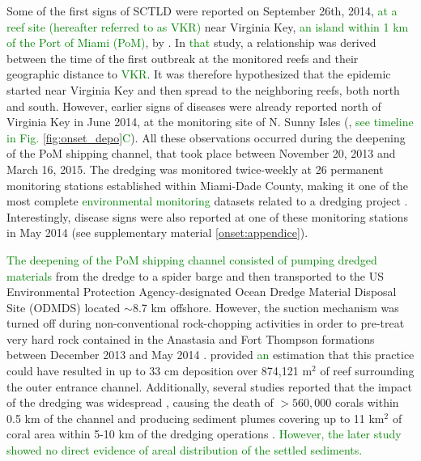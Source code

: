 \documentclass[preprint,12pt,authoryear]{elsarticle}
\newcommand{\modif}[1]{\textcolor{green}{#1}}
\begin{document}
Some of the first signs of SCTLD were reported on September 26th, 2014, \modif{at a reef site (hereafter referred to as VKR)} near Virginia Key, \modif{an island within 1 km of the Port of Miami (PoM)}, by \cite{precht2016unprecedented}. In \modif{that} study, a relationship was derived between the time of the first outbreak at the monitored reefs and their geographic distance to \modif{VKR}. It was therefore hypothesized that the epidemic started near Virginia Key and then spread to the neighboring reefs, both north and south. However, earlier signs of diseases were already reported north of Virginia Key in June 2014, at the monitoring site of N. Sunny Isles (\citealp{precht2016unprecedented}, \modif{see timeline in Fig. \ref{fig:onset_depo}C}). All these observations occurred during the deepening of the PoM shipping channel, that took place between November 20, 2013 and March 16, 2015. The dredging was monitored twice-weekly at 26 permanent monitoring stations established within Miami-Dade County, making it one of the most complete \modif{environmental monitoring} datasets related to a dredging project \citep{gintert2019regional}. Interestingly, disease signs were also reported at one of these monitoring stations in May 2014 (see supplementary material \ref{onset:appendice}).

\modif{The deepening of the PoM shipping channel consisted of pumping dredged materials} from the dredge to a spider barge and then transported to the US Environmental Protection Agency\modif{-}designated Ocean Dredge Material Disposal Site (ODMDS) located $\sim$8.7 km offshore. However, the suction mechanism was turned off during non-conventional rock-chopping activities in order to pre-treat very hard rock contained in the Anastasia and Fort Thompson formations between December 2013 and May 2014 \citep{miller2016detecting}. \cite{usace2017} provided \modif{an} estimation that this practice could have resulted in up to 33 cm deposition over 874,121 m$^2$ of reef surrounding the outer entrance channel. Additionally, several studies reported that the impact of the dredging was widespread \citep{miller2016detecting}, causing the death of  $> 560,000$ corals within 0.5 km of the channel \citep{cunning2019extensive} and producing sediment plumes covering up to 11 km$^2$ of coral area within 5-10 km of the dredging operations \citep{barnes2015sediment}. \modif{However, the later study showed no direct evidence of areal distribution of the settled sediments.} 
\end{document}
